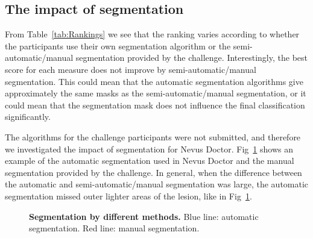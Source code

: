\documentclass[10pt,letterpaper]{article}
\begin{document}
\subsection*{The impact of segmentation}

From Table~\ref{tab:Rankings} we see that the ranking varies according to whether the participants use their own segmentation algorithm or the semi-automatic/manual segmentation provided by the challenge. 
Interestingly, the best score for each measure does not improve by semi-automatic/manual segmentation. 
This could mean that the automatic segmentation algorithms give approximately the same masks as the semi-automatic/manual segmentation, or it could mean that the segmentation mask does not influence the final classification significantly.

The algorithms for the challenge participants were not submitted, and therefore we investigated the impact of segmentation for Nevus Doctor. 
Fig~\ref{fig:Border} shows an example of the automatic segmentation used in Nevus Doctor and the manual segmentation provided by the challenge. 
In general, when the difference between the automatic and semi-automatic/manual segmentation was large, the automatic segmentation missed outer lighter areas of the lesion, like in Fig~\ref{fig:Border}. 

\begin{figure}[!h]
\caption{{\bf Segmentation by different methods.}
Blue line: automatic segmentation. Red line: manual segmentation.}
\label{fig:Border}
\end{figure}
\end{document}

